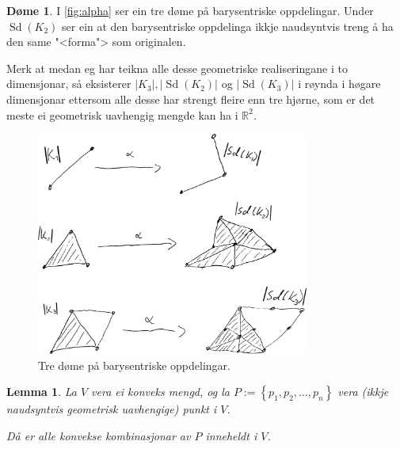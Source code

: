 \documentclass[a4paper, 12pt, norsk]{article}
\theoremstyle{plain}
\newtheorem{lemma}[theorem]{Lemma}
\theoremstyle{definition}
\newtheorem{example}[theorem]{Døme}
\newcommand{\Rb}{\mathbb{R}}
\newcommand{\gr}[1]{ \lvert #1 \rvert } %
\newcommand{\set}[1]{ \left\{ #1 \right\} } %
\DeclareMathOperator{\Sd}{Sd} %
\begin{document}
\begin{example}
	I \autoref{fig:alpha} ser ein tre døme på barysentriske oppdelingar. Under \( \Sd(K_2) \) ser ein at den barysentriske oppdelinga ikkje naudsyntvis treng å ha den same "<forma"> som originalen.
	
	Merk at medan eg har teikna alle desse geometriske realiseringane i to dimensjonar, så eksisterer \( \gr{K_3}, \gr{\Sd(K_2)} \) og \( \gr{\Sd(K_3)} \) i røynda i høgare dimensjonar ettersom alle desse har strengt fleire enn tre hjørne, som er det meste ei geometrisk uavhengig mengde kan ha i \( \Rb^2 \).
	\begin{figure}[htbp]
		\begin{center}
			\includegraphics[width=0.8\textwidth]{png/Alpha.png}
		\end{center}
		\caption{Tre døme på barysentriske oppdelingar.}
		\label{fig:alpha}
	\end{figure}
\end{example}

\begin{lemma} \label{thm:konveks-kombinasjon-i-konveks}
	La \( V \) vera ei konveks mengd, og la \( P := \set{p_1, p_2, \dots, p_n } \) vera (ikkje naudsyntvis geometrisk uavhengige) punkt i \( V \).
	
	Då er alle konvekse kombinasjonar av \( P \) inneheldt i \( V \).
\end{lemma}
\end{document}

